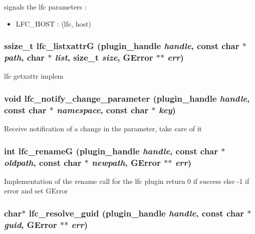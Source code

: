 signals the lfc parameters :\begin{itemize}
\item LFC\_\-HOST : (lfc, host) \end{itemize}
\subsubsection{\setlength{\rightskip}{0pt plus 5cm}ssize\_\-t lfc\_\-listxattr\-G (plugin\_\-handle {\em handle}, const char $\ast$ {\em path}, char $\ast$ {\em list}, size\_\-t {\em size}, GError $\ast$$\ast$ {\em err})}\label{gfal__common__lfc_8c_b1b1a0499ef8e0fda5a569d34b5e0bee}


lfc getxattr implem 
\subsubsection{\setlength{\rightskip}{0pt plus 5cm}void lfc\_\-notify\_\-change\_\-parameter (plugin\_\-handle {\em handle}, const char $\ast$ {\em namespace}, const char $\ast$ {\em key})}\label{gfal__common__lfc_8c_17278b0b118ad8453aae47db7bee6b67}


Receive notification of a change in the parameter, take care of it 
\subsubsection{\setlength{\rightskip}{0pt plus 5cm}int lfc\_\-rename\-G (plugin\_\-handle {\em handle}, const char $\ast$ {\em oldpath}, const char $\ast$ {\em newpath}, GError $\ast$$\ast$ {\em err})}\label{gfal__common__lfc_8c_b9390ad8a22cb5a0137547bb894d85b7}


Implementation of the rename call for the lfc plugin return 0 if success else -1 if error and set GError 
\subsubsection{\setlength{\rightskip}{0pt plus 5cm}char$\ast$ lfc\_\-resolve\_\-guid (plugin\_\-handle {\em handle}, const char $\ast$ {\em guid}, GError $\ast$$\ast$ {\em err})}\label{gfal__common__lfc_8c_5e7057c566c276986a69faa94abd3b82}


